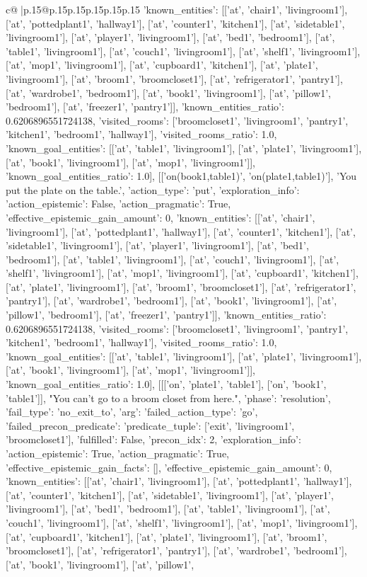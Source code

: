 \documentclass{article}
\begin{document}
{\begin{supertabular}{c@{$\;$}|p{.15\linewidth}@{}p{.15\linewidth}p{.15\linewidth}p{.15\linewidth}p{.15\linewidth}p{.15\linewidth}}
{{{'known_entities': [['at', 'chair1', 'livingroom1'], ['at', 'pottedplant1', 'hallway1'], ['at', 'counter1', 'kitchen1'], ['at', 'sidetable1', 'livingroom1'], ['at', 'player1', 'livingroom1'], ['at', 'bed1', 'bedroom1'], ['at', 'table1', 'livingroom1'], ['at', 'couch1', 'livingroom1'], ['at', 'shelf1', 'livingroom1'], ['at', 'mop1', 'livingroom1'], ['at', 'cupboard1', 'kitchen1'], ['at', 'plate1', 'livingroom1'], ['at', 'broom1', 'broomcloset1'], ['at', 'refrigerator1', 'pantry1'], ['at', 'wardrobe1', 'bedroom1'], ['at', 'book1', 'livingroom1'], ['at', 'pillow1', 'bedroom1'], ['at', 'freezer1', 'pantry1']], 'known_entities_ratio': 0.6206896551724138, 'visited_rooms': ['broomcloset1', 'livingroom1', 'pantry1', 'kitchen1', 'bedroom1', 'hallway1'], 'visited_rooms_ratio': 1.0, 'known_goal_entities': [['at', 'table1', 'livingroom1'], ['at', 'plate1', 'livingroom1'], ['at', 'book1', 'livingroom1'], ['at', 'mop1', 'livingroom1']], 'known_goal_entities_ratio': 1.0}}], [['on(book1,table1)', 'on(plate1,table1)'], 'You put the plate on the table.', {'action_type': 'put', 'exploration_info': {'action_epistemic': False, 'action_pragmatic': True, 'effective_epistemic_gain_amount': 0, 'known_entities': [['at', 'chair1', 'livingroom1'], ['at', 'pottedplant1', 'hallway1'], ['at', 'counter1', 'kitchen1'], ['at', 'sidetable1', 'livingroom1'], ['at', 'player1', 'livingroom1'], ['at', 'bed1', 'bedroom1'], ['at', 'table1', 'livingroom1'], ['at', 'couch1', 'livingroom1'], ['at', 'shelf1', 'livingroom1'], ['at', 'mop1', 'livingroom1'], ['at', 'cupboard1', 'kitchen1'], ['at', 'plate1', 'livingroom1'], ['at', 'broom1', 'broomcloset1'], ['at', 'refrigerator1', 'pantry1'], ['at', 'wardrobe1', 'bedroom1'], ['at', 'book1', 'livingroom1'], ['at', 'pillow1', 'bedroom1'], ['at', 'freezer1', 'pantry1']], 'known_entities_ratio': 0.6206896551724138, 'visited_rooms': ['broomcloset1', 'livingroom1', 'pantry1', 'kitchen1', 'bedroom1', 'hallway1'], 'visited_rooms_ratio': 1.0, 'known_goal_entities': [['at', 'table1', 'livingroom1'], ['at', 'plate1', 'livingroom1'], ['at', 'book1', 'livingroom1'], ['at', 'mop1', 'livingroom1']], 'known_goal_entities_ratio': 1.0}}], [[['on', 'plate1', 'table1'], ['on', 'book1', 'table1']], "You can't go to a broom closet from here.", {'phase': 'resolution', 'fail_type': 'no_exit_to', 'arg': {'failed_action_type': 'go', 'failed_precon_predicate': {'predicate_tuple': ['exit', 'livingroom1', 'broomcloset1'], 'fulfilled': False, 'precon_idx': 2}}, 'exploration_info': {'action_epistemic': True, 'action_pragmatic': True, 'effective_epistemic_gain_facts': [], 'effective_epistemic_gain_amount': 0, 'known_entities': [['at', 'chair1', 'livingroom1'], ['at', 'pottedplant1', 'hallway1'], ['at', 'counter1', 'kitchen1'], ['at', 'sidetable1', 'livingroom1'], ['at', 'player1', 'livingroom1'], ['at', 'bed1', 'bedroom1'], ['at', 'table1', 'livingroom1'], ['at', 'couch1', 'livingroom1'], ['at', 'shelf1', 'livingroom1'], ['at', 'mop1', 'livingroom1'], ['at', 'cupboard1', 'kitchen1'], ['at', 'plate1', 'livingroom1'], ['at', 'broom1', 'broomcloset1'], ['at', 'refrigerator1', 'pantry1'], ['at', 'wardrobe1', 'bedroom1'], ['at', 'book1', 'livingroom1'], ['at', 'pillow1', }}}
\end{supertabular}}
\end{document}
